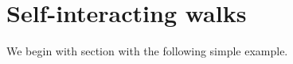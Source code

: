 \begin{example}
\end{example}



\section{Self-interacting walks}
\label{sec:walks}




We begin with section with the following simple example.


